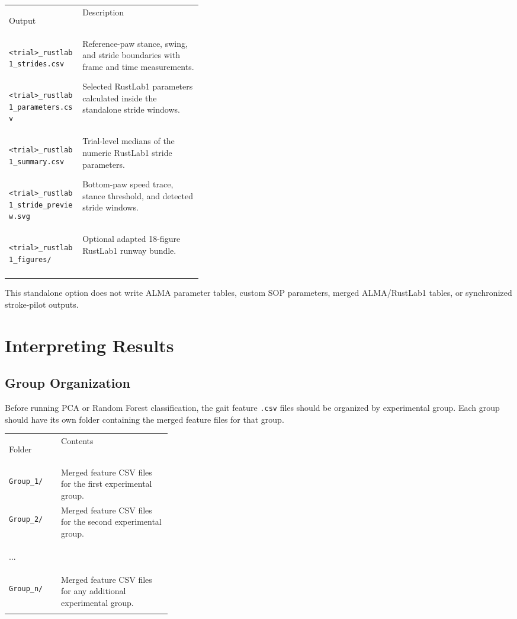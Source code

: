 \documentclass[11pt]{article}
\newif\ifalmaoutputtable
\newcommand{\boxedtoprule}{%
  \ifalmaoutputtable
    \arrayrulecolor{calloutOutputFrame}\hline\rowcolor{calloutOutputHeader}%
  \else
    \arrayrulecolor{almaBlue!62}\hline\rowcolor{almaSky!78}%
  \fi
}
\newcommand{\boxedmidrule}{%
  \ifalmaoutputtable
    \arrayrulecolor{calloutOutputFrame}\hline
  \else
    \arrayrulecolor{calloutDataFrame}\hline
  \fi
}
\newcommand{\boxedbottomrule}{%
  \ifalmaoutputtable
    \arrayrulecolor{calloutOutputFrame}\hline
  \else
    \arrayrulecolor{almaBlue!62}\hline
  \fi
}
\renewcommand{\[}{%
  \par\smallskip\noindent
  \begin{center}%
  \setlength{\fboxsep}{5pt}%
  \setlength{\fboxrule}{0.35pt}%
  \begin{lrbox}{\almaEquationBox}%
  $\displaystyle
}
\renewcommand{\]}{%
  $%
  \end{lrbox}%
  \fcolorbox{equationLine}{equationBack}{\usebox{\almaEquationBox}}%
  \end{center}%
  \smallskip\par
}
\begin{document}
\begin{tcolorbox}[output file box,title=\textbf{Standalone RustLab1 Output Files}]
\begin{tabularx}{\linewidth}{
>{\bfseries\raggedright\arraybackslash}p{0.38\linewidth}|
>{\raggedright\arraybackslash}X
}
\boxedtoprule
Output & Description \\
\boxedmidrule
\texttt{<trial>\_rustlab1\_strides.csv} & Reference-paw stance, swing, and stride boundaries with frame and time measurements. \\
\texttt{<trial>\_rustlab1\_parameters.csv} & Selected RustLab1 parameters calculated inside the standalone stride windows. \\
\texttt{<trial>\_rustlab1\_summary.csv} & Trial-level medians of the numeric RustLab1 stride parameters. \\
\texttt{<trial>\_rustlab1\_stride\_preview.svg} & Bottom-paw speed trace, stance threshold, and detected stride windows. \\
\texttt{<trial>\_rustlab1\_figures/} & Optional adapted 18-figure RustLab1 runway bundle. \\
\boxedbottomrule
\end{tabularx}
\end{tcolorbox}

This standalone option does not write ALMA parameter tables, custom SOP
parameters, merged ALMA/RustLab1 tables, or synchronized stroke-pilot outputs.



\section{Interpreting Results}

\subsection{Group Organization}

Before running PCA or Random Forest classification, the gait feature \texttt{.csv} files should be organized by experimental group. Each group should have its own folder containing the merged feature files for that group.

\begin{tcolorbox}[compact table box,title=\textbf{Recommended Group Folder Structure}]
\begin{tabularx}{\linewidth}{
>{\bfseries\raggedright\arraybackslash}p{0.32\linewidth}|
>{\raggedright\arraybackslash}X
}
\boxedtoprule
Folder & Contents \\
\boxedmidrule
\texttt{Group\_1/} & Merged feature CSV files for the first experimental group. \\
\texttt{Group\_2/} & Merged feature CSV files for the second experimental group. \\
...\\
\texttt{Group\_n/} & Merged feature CSV files for any additional experimental group. \\
\boxedbottomrule
\end{tabularx}
\end{tcolorbox}
\end{document}
